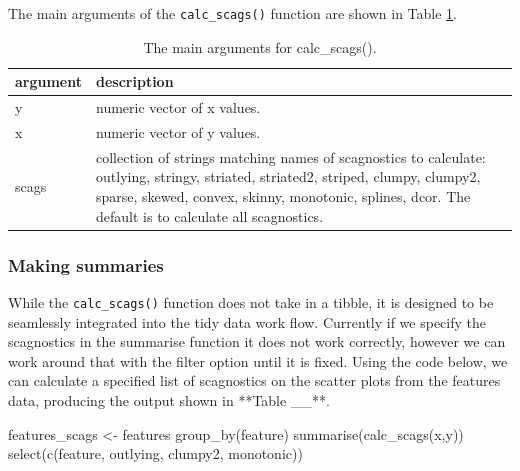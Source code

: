 The main arguments of the \texttt{calc\_scags()} function are shown in
Table \ref{tab:calcfunc-tb-pdf}.

\begin{Schunk}
\begin{table}

\caption{\label{tab:calcfunc-tb-pdf}The main arguments for calc\_scags().}
\centering
\begin{tabular}[t]{l|l}
\hline
argument & description\\
\hline
y & numeric vector of x values.\\
\hline
x & numeric vector of y values.\\
\hline
scags & collection of strings matching names of scagnostics to calculate: outlying, stringy, striated, striated2, striped, clumpy, clumpy2, sparse, skewed, convex, skinny, monotonic, splines, dcor. The default is to calculate all scagnostics.\\
\hline
\end{tabular}
\end{table}

\end{Schunk}

\hypertarget{making-summaries}{%
\subsubsection{Making summaries}\label{making-summaries}}

While the \texttt{calc\_scags()} function does not take in a tibble, it
is designed to be seamlessly integrated into the tidy data work flow.
Currently if we specify the scagnostics in the summarise function it
does not work correctly, however we can work around that with the filter
option until it is fixed. Using the code below, we can calculate a
specified list of scagnostics on the scatter plots from the features
data, producing the output shown in **Table \_\_**.

\begin{Schunk}
\begin{Sinput}
features_scags <- features %
  group_by(feature) %
  summarise(calc_scags(x,y)) %
  select(c(feature, outlying, clumpy2, monotonic))
\end{Sinput}
\end{Schunk}

